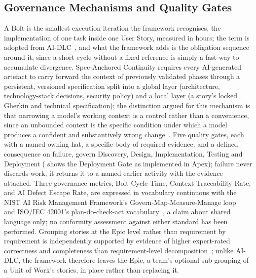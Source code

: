 \documentclass[sigconf,review=false]{acmart}
\begin{document}
\subsection{Governance Mechanisms and Quality Gates}
\label{sec:governance}
A Bolt is the smallest execution iteration the framework recognises, the implementation of one task inside one User Story, measured in hours; the term is adopted from AI-DLC~\cite{AWS:2025aidlc}, and what the framework adds is the obligation sequence around it, since a short cycle without a fixed reference is simply a fast way to accumulate divergence. Spec-Anchored Continuity requires every AI-generated artefact to carry forward the context of previously validated phases through a persistent, versioned specification split into a global layer (architecture, technology-stack decisions, security policy) and a local layer (a story's locked Gherkin and technical specification); the distinction argued for this mechanism is that narrowing a model's working context is a control rather than a convenience, since an unbounded context is the specific condition under which a model produces a confident and substantively wrong change~\cite{Zhao:2025vibe}. Five quality gates, each with a named owning hat, a specific body of required evidence, and a defined consequence on failure, govern Discovery, Design, Implementation, Testing and Deployment ( shows the Deployment Gate as implemented in Apex); failure never discards work, it returns it to a named earlier activity with the evidence attached. Three governance metrics, Bolt Cycle Time, Context Traceability Rate, and AI Defect Escape Rate, are expressed in vocabulary continuous with the NIST AI Risk Management Framework's Govern-Map-Measure-Manage loop~\cite{NIST:2023rmf} and ISO/IEC 42001's plan-do-check-act vocabulary~\cite{ISO/IEC:2023ai}, a claim about shared language only; no conformity assessment against either standard has been performed. Grouping stories at the Epic level rather than requirement by requirement is independently supported by evidence of higher expert-rated correctness and completeness than requirement-level decomposition~\cite{Siddeeq:2026gh}; unlike AI-DLC, the framework therefore leaves the Epic, a team's optional sub-grouping of a Unit of Work's stories, in place rather than replacing it.
\end{document}

